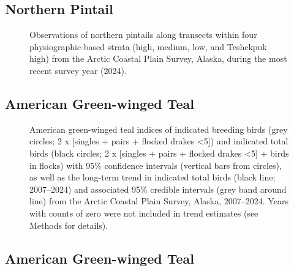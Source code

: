 \documentclass[
]{article}
\begin{document}
\endgroup{}

\newpage{}

\subsection*{Northern Pintail}\label{northern-pintail-2}

\begin{figure}


\caption{\label{fig-NOPImap}Observations of northern pintails along
transects within four physiographic-based strata (high, medium, low, and
Teshekpuk high) from the Arctic Coastal Plain Survey, Alaska, during the
most recent survey year (2024).}

\end{figure}%

\newpage{}

\subsection*{American Green-winged
Teal}\label{american-green-winged-teal}

\begin{figure}


\caption{\label{fig-GWTE}American green-winged teal indices of indicated
breeding birds (grey circles; 2 x {[}singles + pairs + flocked drakes
\textless5{]}) and indicated total birds (black circles; 2 x {[}singles
+ pairs + flocked drakes \textless5{]} + birds in flocks) with 95\%
confidence intervals (vertical bars from circles), as well as the
long-term trend in indicated total birds (black line; 2007--2024) and
associated 95\% credible intervals (grey band around line) from the
Arctic Coastal Plain Survey, Alaska, 2007--2024. Years with counts of
zero were not included in trend estimates (see Methods for details).}

\end{figure}%

\newpage{}

\subsection*{American Green-winged
Teal}\label{american-green-winged-teal-1}
\end{document}

